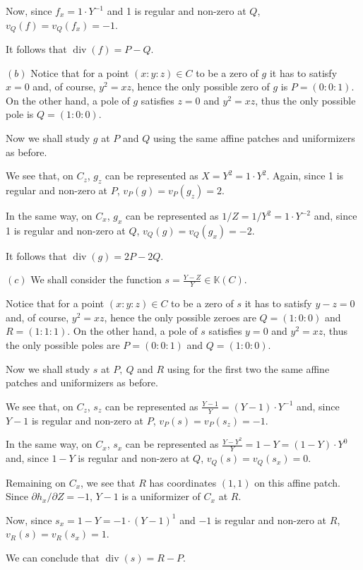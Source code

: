 \documentclass{article}
\newcommand{\numberset}{\mathbb}
\newcommand{\K}{\numberset{K}}
\newcommand{\exercise}[1]{\noindent {\bf Exercise #1}}
\DeclareMathOperator{\divr}{div}
\begin{document}
Now, since $f_x=1\cdot Y^{-1}$ and 1 is regular and non-zero at $Q$, 
$v_Q(f)=v_Q(f_x)=-1$.

It follows that $\divr(f)=P-Q$.

$(b)$ Notice that for a point $(x:y:z)\in C$ to be a zero of $g$ it has to
satisfy $x=0$ and, of course, $y^2=xz$, hence the only possible zero of $g$
is $P=(0:0:1)$. On the other hand, a pole of $g$ satisfies
$z=0$ and $y^2=xz$, thus the only possible pole is $Q=(1:0:0)$.

Now we shall study $g$ at $P$ and $Q$ using the same affine patches and
uniformizers as before.

We see that, on $C_z$, $g_z$ can be represented as $X=Y^2=1\cdot Y^2$. Again,
since 1 is regular and non-zero at $P$, $v_P(g)=v_P(g_z)=2$.

In the same way, on $C_x$, $g_x$ can be represented as $1/Z=1/Y^2=1\cdot Y^{-2}$ and,
since 1 is regular and non-zero at $Q$, $v_Q(g)=v_Q(g_x)=-2$.

It follows that $\divr(g)=2P-2Q$.

$(c)$ We shall consider the function $s=\frac{Y-Z}{Y}\in\K(C)$.

Notice that for a point $(x:y:z)\in C$ to be a zero of $s$ it has to satisfy
$y-z=0$ and, of course, $y^2=xz$, hence the only possible zeroes are $Q=(1:0:0)$
and $R=(1:1:1)$. On the other hand, a pole of $s$ satisfies $y=0$ and $y^2=xz$,
thus the only possible poles are $P=(0:0:1)$ and $Q=(1:0:0)$.

Now we shall study $s$ at $P,\ Q$ and $R$ using for the first two the same
affine patches and uniformizers as before.

We see that, on $C_z$, $s_z$ can be represented as $\frac{Y-1}{Y}=(Y-1)\cdot
Y^{-1}$ and, since $Y-1$ is regular and non-zero at $P$, $v_P(s)=v_P(s_z)=-1$.

In the same way, on $C_x$, $s_x$ can be represented as
$\frac{Y-Y^2}{Y}=1-Y=(1-Y)\cdot Y^0$ and, since $1-Y$ is regular
and non-zero at $Q$, $v_Q(s)=v_Q(s_x)=0$.

Remaining on $C_x$, we see that $R$ has coordinates $(1,1)$ on this affine
patch. Since $\partial{h_x}/\partial{Z}=-1$, $Y-1$ is a uniformizer of $C_x$ at
$R$.

Now, since $s_x=1-Y=-1\cdot (Y-1)^1$ and $-1$ is regular and
non-zero at $R$, $v_R(s)=v_R(s_x)=1$.

We can conclude that $\divr(s)=R-P$.


~\\
\exercise{5}
\end{document}

